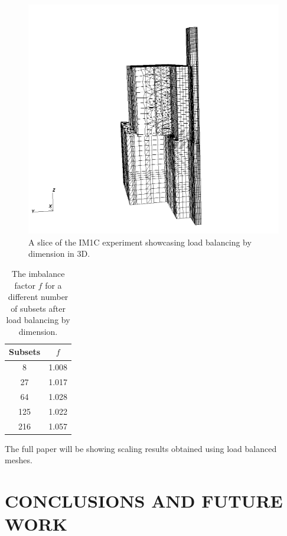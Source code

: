 \documentclass[letterpaper]{mandc2019}
\begin{document}
\begin{figure}[H]
\centering
\includegraphics[scale=0.5]{figures/im1_foam_448.png}
\caption{A slice of the IM1C experiment showcasing load balancing by dimension in 3D.}
\label{lbd}
\end{figure}

\begin{table}[H]
\centering
\begin{tabular}{c c}

   \textbf{Subsets} & \textbf{$f$} \\
   \hline
   8 & 1.008 \\
  27 & 1.017 \\
  64 & 1.028 \\
 125 & 1.022 \\
 216 & 1.057 \\
\hline
\end{tabular}
\caption{The imbalance factor $f$ for a different number of subsets after load balancing by dimension.}
\label{lbd_f}
\end{table}
\vspace{-3cm}

The full paper will be showing scaling results obtained using load balanced meshes.

\section{CONCLUSIONS AND FUTURE WORK}
\end{document}
